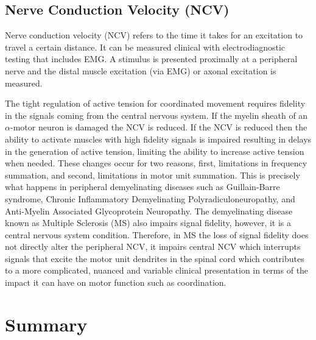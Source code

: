 \subsection{Nerve Conduction Velocity (NCV)}

Nerve conduction velocity (NCV) refers to the time it takes for an excitation to travel a certain distance. It can be measured clinical with electrodiagnostic testing that includes EMG. A stimulus is presented proximally at a peripheral nerve and the distal muscle excitation (via EMG) or axonal excitation is measured.

The tight regulation of active tension for coordinated movement requires fidelity in the signals coming from the central nervous system.\footnotemark{} If the myelin sheath of an $\alpha$-motor neuron is damaged the NCV is reduced. If the NCV is reduced then the ability to activate muscles with high fidelity signals is impaired resulting in delays in the generation of active tension, limiting the ability to increase active tension when needed. These changes occur for two reasons, first, limitations in frequency summation, and second, limitations in motor unit summation. This is precisely what happens in peripheral demyelinating diseases such as Guillain-Barre syndrome, Chronic Inflammatory Demyelinating Polyradiculoneuropathy, and Anti-Myelin Associated Glycoprotein Neuropathy. The demyelinating disease known as Multiple Sclerosis (MS) also impairs signal fidelity, however, it is a central nervous system condition. Therefore, in MS the loss of signal fidelity does not directly alter the peripheral NCV, it impairs central NCV which interrupts signals that excite the motor unit dendrites in the spinal cord which contributes to a more complicated, nuanced and variable clinical presentation in terms of the impact it can have on motor function such as coordination.

\section{Summary}

